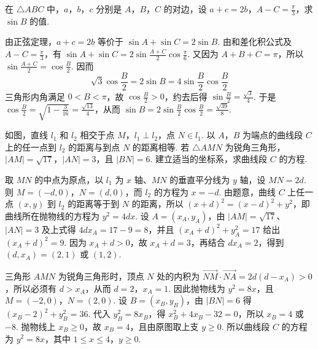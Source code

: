 \documentclass[UTF8,a4paper,oneside,11pt]{ctexbook}
\begin{document}
\begin{problem}
在 \(\triangle ABC\) 中，\(a\)，\(b\)，\(c\) 分别是 \(A\)，\(B\)，\(C\) 的对边，设 \(a + c = 2b\)，\(A - C = \frac{\pi}{3}\)，求 \(\sin B\) 的值.
\end{problem}

\begin{solution}
由正弦定理，\(a+c=2b\) 等价于 \(\sin A+\sin C=2\sin B\). 由和差化积公式及 \(A-C=\frac{\pi}{3}\)，有 \(\sin A+\sin C=2\sin\frac{A+C}{2}\cos\frac{\pi}{6}\). 又因为 \(A+B+C=\pi\)，所以 \(\sin\frac{A+C}{2}=\cos\frac{B}{2}\). 因而
\[
\sqrt{3}\cos\frac{B}{2}=2\sin B=4\sin\frac{B}{2}\cos\frac{B}{2}
\]
三角形内角满足 \(0<B<\pi\)，故 \(\cos\frac{B}{2}>0\)，约去后得 \(\sin\frac{B}{2}=\frac{\sqrt{3}}{4}\). 于是 \(\cos\frac{B}{2}=\sqrt{1-\frac{3}{16}}=\frac{\sqrt{13}}{4}\)，从而 \(\sin B=2\sin\frac{B}{2}\cos\frac{B}{2}=\frac{\sqrt{39}}{8}\).
\end{solution}

\begin{problem}
如图，直线 \(l_{1}\) 和 \(l_{2}\) 相交于点 \(M\)，\(l_{1} \perp l_{2}\)，点 \(N \in l_{1}\). 以 \(A\)，\(B\) 为端点的曲线段 \(C\) 上的任一点到 \(l_{2}\) 的距离与到点 \(N\) 的距离相等. 若 \(\triangle AMN\) 为锐角三角形，\(|AM| = \sqrt{17}\)，\(|AN| = 3\)，且 \(|BN| = 6\). 建立适当的坐标系，求曲线段 \(C\) 的方程.

\end{problem}

\begin{solution}
取 \(MN\) 的中点为原点，以 \(l_1\) 为 \(x\) 轴、\(MN\) 的垂直平分线为 \(y\) 轴，设 \(MN=2d\). 则 \(M=(-d,0)\)，\(N=(d,0)\)，而 \(l_2\) 的方程为 \(x=-d\). 由题意，曲线 \(C\) 上任一点 \((x,y)\) 到 \(l_2\) 的距离等于到 \(N\) 的距离，所以 \((x+d)^2=(x-d)^2+y^2\)，即曲线所在抛物线的方程为 \(y^2=4dx\). 设 \(A=(x_A,y_A)\)，由 \(|AM|=\sqrt{17}\)、\(|AN|=3\) 及上式得 \(4dx_A=17-9=8\)，并且 \((x_A+d)^2+y_A^2=17\) 给出 \((x_A+d)^2=9\). 因为 \(x_A+d>0\)，故 \(x_A+d=3\)，再结合 \(dx_A=2\)，得到 \((d,x_A)=(2,1)\) 或 \((1,2)\).

三角形 \(AMN\) 为锐角三角形时，顶点 \(N\) 处的内积为 \(\overrightarrow{NM}\cdot\overrightarrow{NA}=2d(d-x_A)>0\)，所以必须有 \(d>x_A\)，从而 \(d=2\)，\(x_A=1\). 因此抛物线为 \(y^2=8x\)，且 \(M=(-2,0)\)，\(N=(2,0)\). 设 \(B=(x_B,y_B)\)，由 \(|BN|=6\) 得 \((x_B-2)^2+y_B^2=36\). 代入 \(y_B^2=8x_B\)，得 \(x_B^2+4x_B-32=0\)，所以 \(x_B=4\) 或 \(-8\). 抛物线上 \(x_B\geqslant0\)，故 \(x_B=4\)，且由原图取上支 \(y\geqslant0\). 所以曲线段 \(C\) 的方程为 \(y^2=8x\)，其中 \(1\leqslant x\leqslant4\)，\(y\geqslant0\).
\end{solution}
\end{document}
